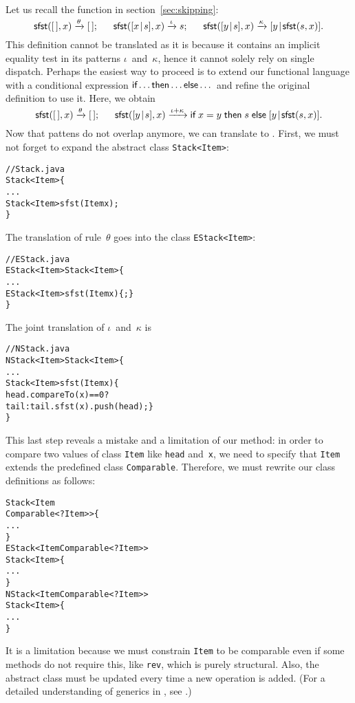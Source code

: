 Let us recall the function  in
section~\vref{sec:skipping}:
\begin{equation*}
\textsf{sfst}([\,],x)          \xrightarrow{\smash{\theta}} [\,];\quad\;\;
\textsf{sfst}([{x}\!\mid\!{s}],x)  \xrightarrow{\smash{\iota}}  s;\quad\;\;
\textsf{sfst}([{y}\!\mid\!{s}],x)  \xrightarrow{\smash{\kappa}}
                                         [{y}\!\mid\!{\textsf{sfst}(s,x)}].
\end{equation*}
This definition cannot be translated as it is because it contains an
implicit equality test in its patterns \(\iota\)~and~\(\kappa\), hence
it cannot solely rely on single dispatch. Perhaps the easiest way to
proceed is to extend our functional language with a conditional
expression \(\textsf{if} \dots \textsf{then} \dots \textsf{else} \dots\) and
refine the original definition to use it. Here, we obtain
\begin{equation*}
\textsf{sfst}([\,],x)          \xrightarrow{\smash{\theta}} [\,];\quad\;\;
\textsf{sfst}([{y}\!\mid\!{s}],x)  \xrightarrow{\smash{\iota+\kappa}}
\textsf{if} \; x = y \; \textsf{then} \; s \;
\textsf{else} \; [{y}\!\mid\!{\textsf{sfst}(s,x)}].
\end{equation*}
Now that pattens do not overlap anymore, we can translate to
\Java. First, we must not forget to expand the abstract class
\texttt{Stack<Item>}:
\begin{alltt}
// Stack.java
\public \abstractX \class Stack<Item> \{
  ...
  \public \abstractX Stack<Item> sfst(\final Item x);
\}
\end{alltt}
The translation of rule~\(\theta\) goes into the class
\texttt{EStack<Item>}:
\begin{alltt}
// EStack.java
\public \final \class EStack<Item> \extends Stack<Item> \{
  ...
  \public EStack<Item> sfst(\final Item x) \{ \return \this; \}
\}
\end{alltt}
The joint translation of \(\iota\)~and~\(\kappa\) is
\begin{alltt}
// NStack.java
\public \final \class NStack<Item> \extends Stack<Item> \{
  ...
  \public Stack<Item> sfst(\final Item x) \{
    \return head.compareTo(x) == 0 ?
           tail : tail.sfst(x).push(head); \}
\}
\end{alltt}
This last step reveals a mistake and a limitation of our method: in
order to compare two values of class \texttt{Item} like \texttt{head}
and~\texttt{x}, we need to specify that \texttt{Item} extends the
predefined class \texttt{Comparable}. Therefore, we must rewrite our
class definitions as follows:
\begin{alltt}
\public \abstractX \class Stack<Item
\hfill\extends Comparable<? \super Item>> \{
  ...
\}
\public \class EStack<Item \extends Comparable<? \super Item>>
       \extends Stack<Item> \{
  ...
\}
\public \class NStack<Item \extends Comparable<? \super Item>>
       \extends Stack<Item> \{
  ...
\}
\end{alltt}
It is a limitation because we must constrain \texttt{Item} to be
comparable even if some methods do not require this, like
\texttt{rev}, which is purely structural. Also, the abstract class
must be updated every time a new operation is added. (For a detailed
understanding of generics in \Java, see \cite{NaftalinWadler_2006}.)

